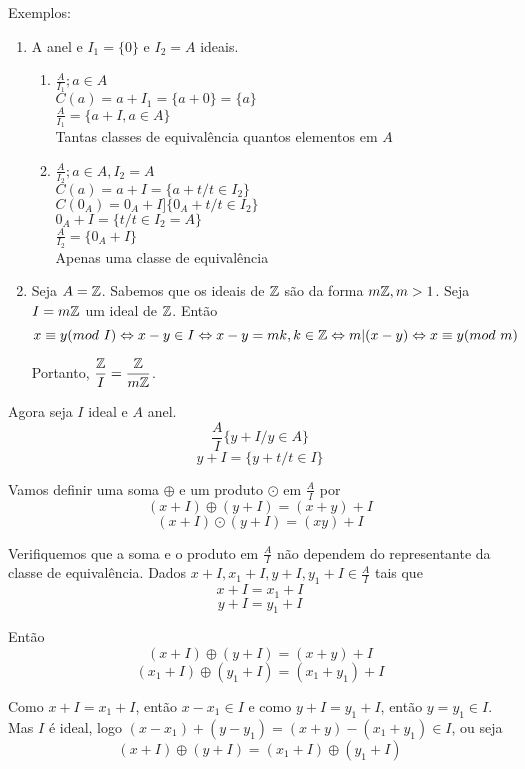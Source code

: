 Exemplos:
\begin{enumerate}
\item A anel e $I_{1}=\{0\}$ e $I_{2}=A$ ideais.
\begin{enumerate}
\item $\displaystyle\frac{A}{I_{1}};a\in A$\\
$C(a)=a+I_{1}=\{a+0\}=\{a\}$\\
$\displaystyle\frac{A}{I_{1}}=\{a+I, a\in A\}$\\
Tantas classes de equival{\^e}ncia quantos elementos em $A$
\item $\displaystyle\frac{A}{I_{2}}; a\in A, I_{2}=A$\\
$C(a)=a+I=\{a+t/t\in I_{2}\}$\\
$C(0_{A})=0_{A}+I]\{0_{A}+t/t\in I_{2}\}$\\
$0_{A}+I=\{t/t\in I_{2}=A\}$\\
$\displaystyle\frac{A}{I_{2}}=\{0_{A}+I\}$\\
Apenas uma classe de equival{\^e}ncia
\end{enumerate}
\item Seja $A=\mathbb{Z}$. Sabemos que os ideais de $\mathbb{Z}$ s{\~a}o da forma $m\mathbb{Z},m>1$. Seja $I=m\mathbb{Z}$ um ideal de $\mathbb{Z}$. Ent{\~a}o\\
\[x\equiv y(mod\ I)\Leftrightarrow x-y\in I \Leftrightarrow x-y=mk,k\in\mathbb{Z}\Leftrightarrow m|(x-y)
\Leftrightarrow x\equiv y(mod\ m)\]

Portanto, $\displaystyle\frac{\mathbb{Z}}{I}=\displaystyle\frac{\mathbb{Z}}{m\mathbb{Z}}$.
\end{enumerate}

Agora seja $I$ ideal e $A$ anel. \[\displaystyle\frac{A}{I}\{y+I/y\in A\}\] \[y+I=\{y+t/t\in I\}\]

Vamos definir uma soma $\oplus$ e um produto $\odot$ em $\displaystyle\frac{A}{I}$ por \[(x+I)\oplus(y+I)=(x+y)+I\] \[(x+I)\odot(y+I)=(xy)+I\]

Verifiquemos que a soma e o produto em $\displaystyle\frac{A}{I}$ n{\~a}o dependem do representante da classe de equival{\^e}ncia. Dados $x+I, x_{1}+I,y+I,y_{1}+I\in\displaystyle\frac{A}{I}$ tais que \[x+I=x_{1}+I\] \[y+I=y_{1}+I\]

Ent{\~a}o
\[(x+I)\oplus(y+I)=(x+y)+I\]
\[(x_{1}+I)\oplus(y_{1}+I)=(x_{1}+y_{1})+I\]

Como $x+I=x_{1}+I$, ent{\~a}o $x-x_{1}\in I$ e como $y+I=y_{1}+I$, ent{\~a}o $y=y_{1}\in I$. Mas $I$ {\'e} ideal, logo $(x-x_{1})+(y-y_{1})=(x+y)-(x_{1}+y_{1})\in I$, ou seja \[(x+I)\oplus(y+I)=(x_{1}+I)\oplus(y_{1}+I)\]

